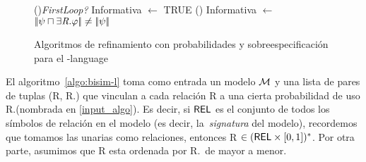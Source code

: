 \begin{figure}[!t]
\begin{algorithm}[H]
\If(){\em FirstLoop?}{
    Informativa $\leftarrow$ TRUE }
\lElse() {Informativa $\leftarrow$ $|\!|\psi \sqcap \exists \mbox{\em R}.\varphi|\!| \neq |\!|\psi|\!|$} 
\end{algorithm}
\vspace*{-.5cm}\caption{Algoritmos de refinamiento con probabilidades y sobreespecificaci\'on para el \el-language}\label{fig:algo3}

\end{figure}



El algoritmo~\ref{algo:bisim-l} toma como entrada un modelo $\mathcal{M}$ y una lista de pares de tuplas (R, R.\puse) que vinculan a cada
relaci\'on R a una cierta probabilidad de uso R.\puse (nombrada en \ref{input_algo}). Es decir, si $\textsf{REL}$ es el
conjunto de todos los s\'imbolos de relaci\'on en el modelo (es decir, la~\emph{signatura} del modelo), recordemos que tomamos las unarias como relaciones, entonces R $\in (\textsf{REL} \times [0,1])^*$. Por otra parte, asumimos que R esta ordenada por R.\puse\ de mayor a menor.


